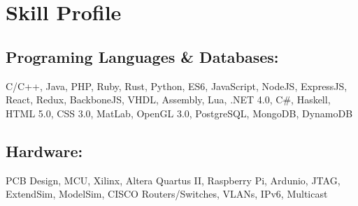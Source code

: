 \documentclass[10pt]{article}
\begin{document}
\section*{Skill Profile}
\subsection*{Programing Languages \& Databases:}
C/C++, Java, PHP, Ruby, Rust, Python, ES6, JavaScript, NodeJS, ExpressJS, React, Redux, BackboneJS, VHDL, Assembly, Lua, .NET 4.0, C\#, Haskell, HTML 5.0, CSS 3.0, MatLab, OpenGL 3.0, PostgreSQL, MongoDB, DynamoDB
\subsection*{Hardware:}
PCB Design, MCU, Xilinx, Altera Quartus II, Raspberry Pi, Ardunio, JTAG, ExtendSim, ModelSim, CISCO Routers/Switches, VLANs, IPv6, Multicast
\end{document}
